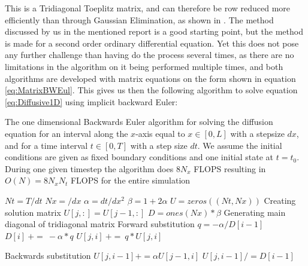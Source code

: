 \documentclass[a4paper,10pt,english]{article}
\begin{document}
This is a Tridiagonal Toeplitz matrix, and can therefore be row reduced more efficiently than through Gaussian Elimination, as shown in \cite{Rapport1}. The method discussed by us in the mentioned report is a good starting point, but the method is made for a second order ordinary differential equation. Yet this does not pose  any further challenge than having do the process several times, as there are no limitations in the algorithm on it being performed multiple times, and both algorithms are developed with matrix equations on the form shown in equation \ref{eq:MatrixBWEul}. This gives us then the following algorithm to solve equation \ref{eq:Diffusive1D} using implicit backward Euler:
\begin{algorithm}[H]
\centering
\caption{The one dimensional Backwards Euler algorithm for solving the diffusion equation for an interval along the $x$-axis equal to $x \in [0,L]$ with a stepsize $dx$, and for a time interval $t \in [0,T]$ with a step size $dt$. We assume the initial conditions are given as fixed boundary conditions and one initial state at $t=t_0$. During one given timestep the algorithm does $8N_x$ \textsc{FLOPS} resulting in $O(N) = 8N_x N_t$ \textsc{FLOPS} for the entire simulation\label{alg:BWE_1D}}
	\begin{algorithmic}[1]
		\State $Nt = T/dt$
		\State $Nx = /dx$
		\State $\alpha = dt/dx^2$
		\State $\beta = 1 + 2\alpha$
		\State $U = zeros((Nt,Nx))$
		\Comment Creating solution matrix
			\State $U[j,:] = U[j-1,:]$
			\State $D = ones(Nx)*\beta$ \Comment Generating main diagonal of tridiagonal matrix
				\Comment Forward substitution
				\State $q = - \alpha / D[i-1]$
				\State $D[i] \ += \ -\alpha * q$
				\State $U[j,i] \ += \  q*U[j,i]$
			\EndFor

				\Comment Backwards substitution 
				\State $U[j,i-1] += \alpha U[j-1,i]$
				\State $U[j,i-1] /= D[i-1]$
			\EndFor
		\EndFor
 
	\end{algorithmic}
\end{algorithm} 
\end{document}
